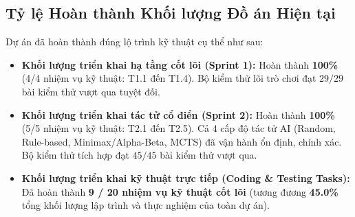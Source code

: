 \documentclass[a4paper,12pt]{report}
\begin{document}
\subsection{Tỷ lệ Hoàn thành Khối lượng Đồ án Hiện tại}
Dự án đã hoàn thành đúng lộ trình kỹ thuật cụ thể như sau:
\begin{itemize}[leftmargin=1.5cm]
    \item \textbf{Khối lượng triển khai hạ tầng cốt lõi (Sprint 1):} Hoàn thành \textbf{100\%} (4/4 nhiệm vụ kỹ thuật: T1.1 đến T1.4). Bộ kiểm thử lõi trò chơi đạt $29/29$ bài kiểm thử vượt qua tuyệt đối.
    \item \textbf{Khối lượng triển khai tác tử cổ điển (Sprint 2):} Hoàn thành \textbf{100\%} (5/5 nhiệm vụ kỹ thuật: T2.1 đến T2.5). Cả 4 cấp độ tác tử AI (Random, Rule-based, Minimax/Alpha-Beta, MCTS) đã vận hành ổn định, chính xác. Bộ kiểm thử tích hợp đạt $45/45$ bài kiểm thử vượt qua.
    \item \textbf{Khối lượng triển khai kỹ thuật trực tiếp (Coding \& Testing Tasks):} Đã hoàn thành \textbf{9 / 20 nhiệm vụ kỹ thuật cốt lõi} (tương đương \textbf{45.0\%} tổng khối lượng lập trình và thực nghiệm của toàn dự án).
\end{itemize}
\end{document}

